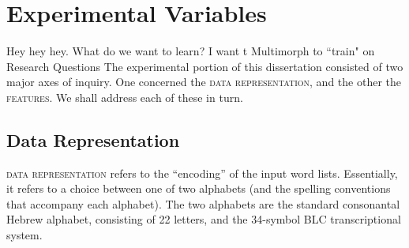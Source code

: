\section{Experimental Variables}\label{sec:expvars}
Hey hey hey. What do we want to learn? I want t Multimorph to ``train" on 
Research Questions
The experimental portion of this dissertation consisted of two major axes of inquiry. One concerned the \textsc{data representation}, and the other the \textsc{features}. We shall address each of these in turn. 


\subsection{Data Representation}\label{sev:expvars:datarep}

\textsc{data representation} refers to the ``encoding'' of the input
word lists. Essentially, it refers to a choice between one of two alphabets (and the spelling conventions that 
accompany each alphabet). The two alphabets are the standard consonantal Hebrew alphabet, consisting of 22 letters,
and the 34-symbol BLC transcriptional system. 



 

